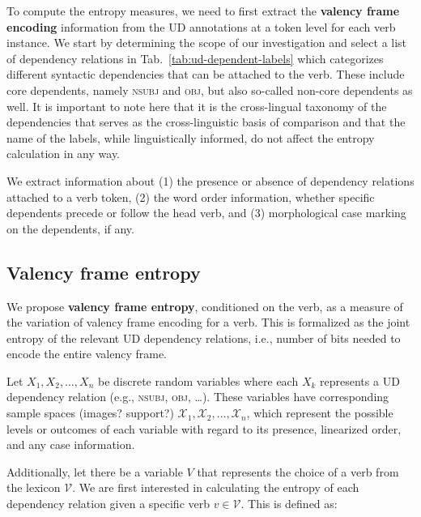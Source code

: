 To compute the entropy measures, we need to first extract the \textbf{valency frame encoding} information from the UD annotations at a token level for each verb instance. We start by determining the scope of our investigation and select a list of dependency relations in Tab.~\ref{tab:ud-dependent-labels} which categorizes different syntactic dependencies that can be attached to the verb. These include core dependents, namely \textsc{nsubj} and \textsc{obj}, but also so-called non-core dependents as well.  It is important to note here that it is the cross-lingual taxonomy of the dependencies that serves as the cross-linguistic basis of comparison and that the name of the labels, while linguistically informed, do not affect the entropy calculation in any way.

We extract information about (1) the presence or absence of dependency relations attached to a verb token, (2) the word order information, whether specific dependents precede or follow the head verb, and (3) morphological case marking on the dependents, if any.


\subsection{Valency frame entropy}

We propose \textbf{valency frame entropy}, conditioned on the verb, as a measure of the variation of valency frame encoding for a verb. This is formalized as the joint entropy of the relevant UD dependency relations, i.e., number of bits needed to encode the entire valency frame.

Let $X_1, X_2,\ldots,X_n$ be discrete random variables where each $X_k$ represents a UD dependency relation (e.g., \textsc{nsubj}, \textsc{obj}, \ldots). These variables have corresponding sample spaces (images? support?) $\mathcal{X}_1, \mathcal{X}_2, \ldots, \mathcal{X}_n$, which represent the possible levels or outcomes of each variable with regard to its presence, linearized order, and any case information.

Additionally, let there be a variable $V$ that represents the choice of a verb from the lexicon $\mathcal{V}$. We are first interested in calculating the entropy of each dependency relation given a specific verb $v \in \mathcal{V}$. This is defined as:

